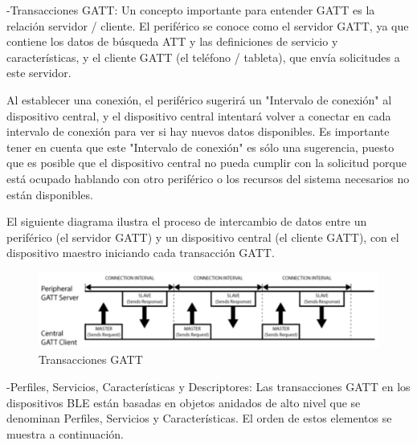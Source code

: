 -Transacciones GATT: Un concepto importante para entender GATT es la relación servidor / cliente. El periférico se conoce como el servidor GATT, ya que contiene los datos de búsqueda ATT y las definiciones de servicio y características, y el cliente GATT (el teléfono / tableta), que envía solicitudes a este servidor. 

Al establecer una conexión, el periférico sugerirá un "Intervalo de conexión" al dispositivo central, y el dispositivo central intentará volver a conectar en cada intervalo de conexión para ver si hay nuevos datos disponibles. Es importante tener en cuenta que este "Intervalo de conexión" es sólo una sugerencia, puesto que es posible que el dispositivo central no pueda cumplir con la solicitud porque está ocupado hablando con otro periférico o los recursos del sistema necesarios no están disponibles.

El siguiente diagrama ilustra el proceso de intercambio de datos entre un periférico (el servidor GATT) y un dispositivo central (el cliente GATT), con el dispositivo maestro iniciando cada transacción GATT.\newline

\begin{figure}[H]
	\centering
	\includegraphics[scale=0.4]{figuras/rn4020/gatt.png}
	\caption{Transacciones GATT \cite{RN4020}}
	\label{gatt}
\end{figure}



-Perfiles, Servicios, Características y Descriptores: Las transacciones GATT en los dispositivos BLE están basadas en objetos anidados de alto nivel que se denominan Perfiles, Servicios y Características. El orden de estos elementos se muestra a continuación.

